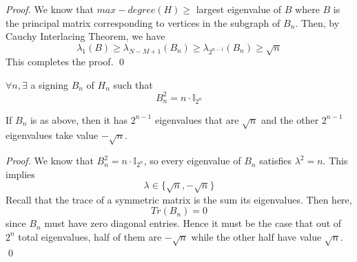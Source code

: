 \begin{proof}
	We know that $max-degree(H) \geq $ largest eigenvalue of $B$ where $B$ is the principal matrix corresponding to vertices in the subgraph of $B_n$. Then, by Cauchy Interlacing Theorem, we have
	\begin{equation}
		\lambda_1(B) \geq \lambda_{N - M + 1}(B_n) \geq \lambda_{2^{n - 1}} (B_n) \geq \sqrt{ n }
	\end{equation}
	This completes the proof. \qed
\end{proof}

\begin{proposition}
	$\forall n, \exists $ a signing $B_n$ of $H_n$ such that 
	\begin{equation}
		B_n^2 = n \cdot \mathbb I _{2^n}
	\end{equation}
\end{proposition}

\begin{proposition}
	If $B_n$ is as above, then it has $2^{n - 1}$ eigenvalues that are $\sqrt {n}$ and the other $2^{n - 1}$ eigenvalues take value $-\sqrt{n}$. 
\end{proposition}

\begin{proof}
	We know that $B_n^2 = n \cdot \mathbb I _ {2 ^ n}$, so every eigenvalue of $B_n$ satisfies $\lambda^2 = n$. This implies 
	\begin{equation}
		\lambda \in \{ \sqrt{n}, - \sqrt{n} \}
	\end{equation}
	Recall that the trace of a symmetric matrix is the sum its eigenvalues. Then here, 
	\begin{equation}
		Tr(B_n) = 0
	\end{equation}
	since $B_n$ must have zero diagonal entries. Hence it must be the case that out of $2^n$ total eigenvalues, half of them are $-\sqrt{n}$ while the other half have value $\sqrt{n}$. \qed
\end{proof}

